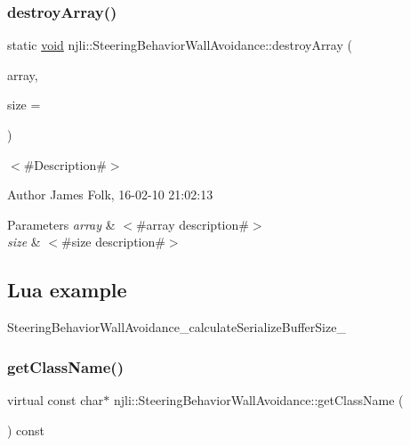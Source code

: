 \subsubsection{\texorpdfstring{destroy\+Array()}{destroyArray()}}
{\footnotesize\ttfamily static \mbox{\hyperlink{_thread_8h_af1e856da2e658414cb2456cb6f7ebc66}{void}} njli\+::\+Steering\+Behavior\+Wall\+Avoidance\+::destroy\+Array (\begin{DoxyParamCaption}\item[{\mbox{\hyperlink{classnjli_1_1_steering_behavior_wall_avoidance}{Steering\+Behavior\+Wall\+Avoidance}} $\ast$$\ast$}]{array,  }\item[{const \mbox{\hyperlink{_util_8h_a10e94b422ef0c20dcdec20d31a1f5049}{u32}}}]{size = {} }\end{DoxyParamCaption})\hspace{0.3cm}{\ttfamily [static]}}



$<$\#\+Description\#$>$ 

\begin{DoxyAuthor}{Author}
James Folk, 16-\/02-\/10 21\+:02\+:13
\end{DoxyAuthor}

\begin{DoxyParams}{Parameters}
{\em array} & $<$\#array description\#$>$ \\
\hline
{\em size} & $<$\#size description\#$>$\\
\hline
\end{DoxyParams}
\hypertarget{classnjli_1_1_steering_behavior_wander_ex1}{}\subsection{Lua example}\label{classnjli_1_1_steering_behavior_wander_ex1}

\begin{DoxyCodeInclude}
\end{DoxyCodeInclude}
Steering\+Behavior\+Wall\+Avoidance\+\_\+calculate\+Serialize\+Buffer\+Size\+\_\+ \mbox{\label{classnjli_1_1_steering_behavior_wall_avoidance_aba07d63c5ecfc79ef1b33d6b4f17dbe1}} 
\subsubsection{\texorpdfstring{get\+Class\+Name()}{getClassName()}}
{\footnotesize\ttfamily virtual const char$\ast$ njli\+::\+Steering\+Behavior\+Wall\+Avoidance\+::get\+Class\+Name (\begin{DoxyParamCaption}{ }\end{DoxyParamCaption}) const\hspace{0.3cm}{\ttfamily [virtual]}}



